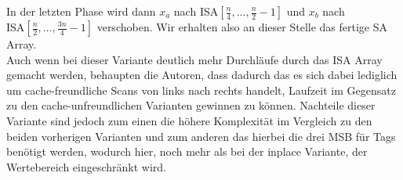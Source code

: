 In der letzten Phase wird dann $x_a$ nach ISA$[\frac{n}{4},...,\frac{n}{2}-1]$ und $x_b$ nach \\ ISA$[\frac{n}{2},...,\frac{3n}{4}-1]$ verschoben. Wir erhalten also an dieser Stelle das fertige SA Array.\\
Auch wenn bei dieser Variante deutlich mehr Durchläufe durch das ISA Array gemacht werden, behaupten die Autoren, dass dadurch das es sich dabei lediglich um cache-freundliche Scans von links nach rechts handelt, Laufzeit im Gegensatz zu den cache-unfreundlichen Varianten gewinnen zu können. Nachteile dieser Variante sind jedoch zum einen die höhere Komplexität im Vergleich zu den beiden vorherigen Varianten und zum anderen das hierbei die drei MSB für Tags benötigt werden, wodurch hier, noch mehr als bei der inplace Variante, der Wertebereich eingeschränkt wird.
